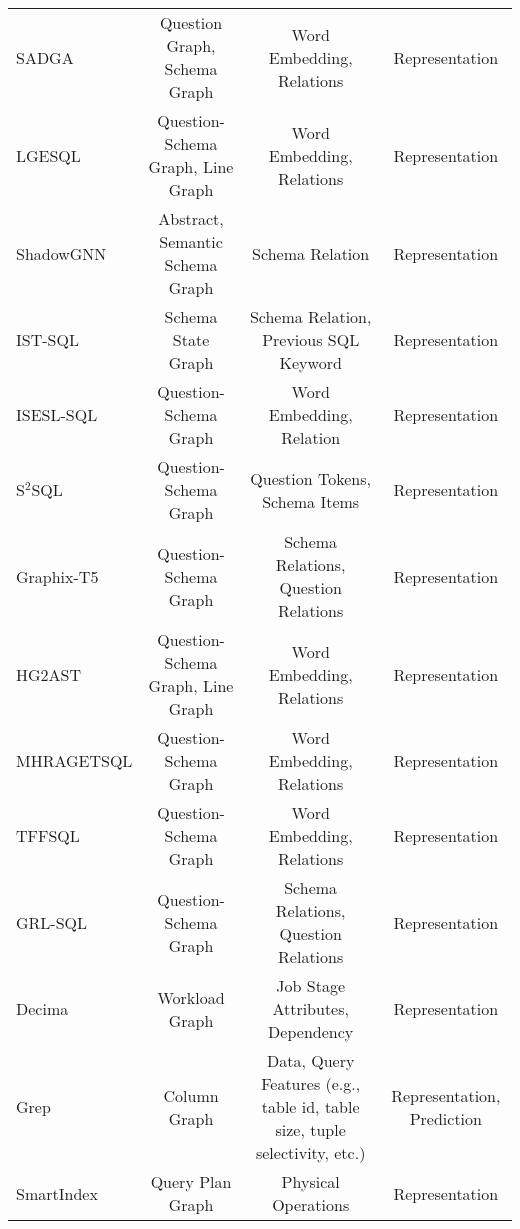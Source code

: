 \begin{table*}[t!]
\begin{small}
{\begin{tabular}{lccc}
SADGA & Question Graph, Schema Graph & Word Embedding, Relations & Representation \\
LGESQL & Question-Schema Graph, Line Graph & Word Embedding, Relations & Representation \\
ShadowGNN & Abstract, Semantic Schema Graph & Schema Relation & Representation \\
IST-SQL & Schema State Graph & Schema Relation, Previous SQL Keyword & Representation \\
ISESL-SQL & Question-Schema Graph & Word Embedding, Relation & Representation \\
S$^2$SQL & Question-Schema Graph & Question Tokens, Schema Items & Representation \\
Graphix-T5 & Question-Schema Graph & Schema Relations, Question Relations & Representation \\
HG2AST & Question-Schema Graph, Line Graph & Word Embedding, Relations & Representation \\
MHRAGETSQL & Question-Schema Graph & Word Embedding, Relations & Representation \\
TFFSQL & Question-Schema Graph & Word Embedding, Relations & Representation \\
GRL-SQL & Question-Schema Graph & Schema Relations, Question Relations & Representation \\
Decima & Workload Graph & Job Stage Attributes, Dependency & Representation \\
Grep & Column Graph & Data, Query Features (e.g., table id, table size, tuple selectivity, etc.) & Representation, Prediction \\
SmartIndex & Query Plan Graph & Physical Operations & Representation \\
\bottomrule
\end{tabular}
}
\end{small}
\end{table*}
